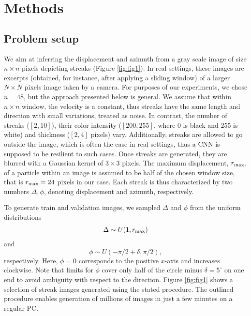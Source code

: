 \documentclass{svjour3}                     %
\begin{document}
\section{Methods}
\label{sec:methodology}

\subsection{Problem setup}

We aim at inferring the displacement and azimuth from a gray scale image of size $n \times n$ pixels depicting streaks (Figure \ref{fig:fig1}). In real settings, these images are excerpts (obtained, for instance, after applying a sliding window) of a larger $N \times N$ pixels image taken by a camera. For purposes of our experiments, we chose $n = 48$, but the approach presented below is general. We assume that within $n \times n$ window, the velocity is a constant, thus streaks have the same length and direction with small variations, treated as noise. In contrast, the number of streaks ($[2, 10]$), their color intensity ($[200, 255]$, where 0 is black and 255 is white) and thickness ($[2, 4]$ pixels) vary. Additionally, streaks are allowed to go outside the image, which is often the case in real settings, thus a CNN is supposed to be resilient to such cases. Once streaks are generated, they are blurred with a Gaussian kernel of $3\times 3$ pixels. The maximum displacement, $r_\textnormal{max}$, of a particle within an image is assumed to be half of the chosen window size, that is $r_\textnormal{max} = 24$ pixels in our case. Each streak is thus characterized by two numbers $\Delta, \phi$, denoting displacement and azimuth, respectively. 

To generate train and validation images, we sampled $\Delta$ and $\phi$ from the uniform distributions
\begin{equation}
\Delta \sim U(1, r_\textnormal{max}) 
\end{equation}
and
\begin{equation}
\phi \sim U(-\pi/2+\delta, \pi/2),
\end{equation}
respectively. 
Here, $\phi = 0$ corresponds to the positive $x$-axis and increases clockwise. 
Note that limits for $\phi$ cover only half of the circle minus $\delta = 5^{\circ}$ on one end to avoid ambiguity with respect to the direction. Figure \ref{fig:fig1} shows a selection of streak images generated using the stated procedure. The outlined procedure enables generation of millions of images in just a few minutes on a regular PC. 
\end{document}
